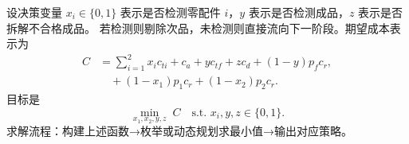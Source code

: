 设决策变量 $x_i\in\{0,1\}$ 表示是否检测零配件 $i$，$y$ 表示是否检测成品，$z$ 表示是否拆解不合格成品。
若检测则剔除次品，未检测则直接流向下一阶段。期望成本表示为
\begin{align}
C &= \sum_{i=1}^2 x_i c_{ti} + c_a + y c_{tf} + z c_d + (1-y) p_f c_r, \\
&\quad + (1-x_1)p_1 c_r + (1-x_2)p_2 c_r.
\end{align}
目标是
\begin{equation}
\min_{x_1,x_2,y,z} \; C \quad \text{s.t. } x_i,y,z\in\{0,1\}.
\end{equation}
求解流程：构建上述函数→枚举或动态规划求最小值→输出对应策略。
